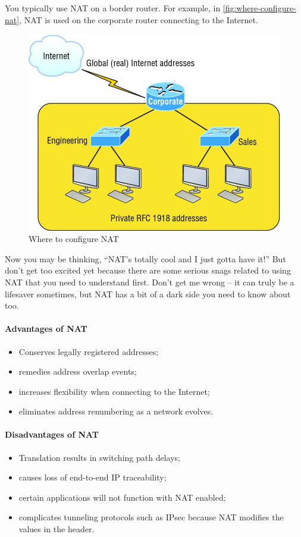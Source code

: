 You typically use NAT on a border router.
For example, in \vref{fig:where-configure-nat}, NAT is used on the corporate router connecting to the Internet.

\begin{figure}
   \centering
   \includegraphics{images/c13f001.jpg}
   \caption{Where to configure NAT}
   \label{fig:where-configure-nat}
\end{figure}

Now you may be thinking, ``NAT's totally cool and I just gotta have it!''
But don't get too excited yet because there are some serious snags related to using NAT that you need to understand first.
Don't get me wrong -- it can truly be a lifesaver sometimes, but NAT has a bit of a dark side you need to know about too.

\paragraph{Advantages of NAT}
\begin{itemize}
   \item Conserves legally registered addresses;
   \item remedies address overlap events;
   \item increases flexibility when connecting to the Internet;
   \item eliminates address renumbering as a network evolves.
\end{itemize}

\paragraph{Disadvantages of NAT}
\begin{itemize}
   \item Translation results in switching path delays;
   \item causes loss of end-to-end IP traceability;
   \item certain applications will not function with NAT enabled;
   \item complicates tunneling protocols such as IPsec because NAT modifies the values in the header.
\end{itemize}

